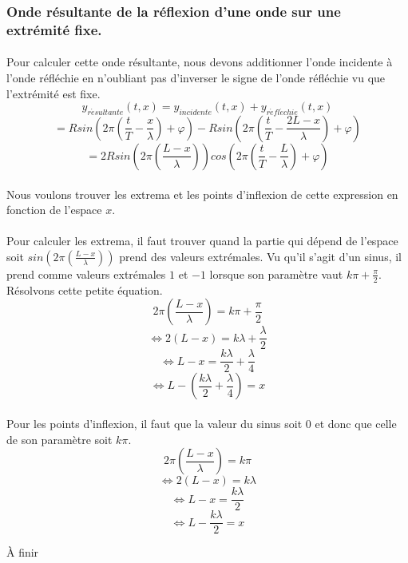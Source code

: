 \documentclass[a4paper]{article}
\begin{document}
\subsubsection{Onde résultante de la réflexion d'une onde sur une extrémité fixe.}
\paragraph{}Pour calculer cette onde résultante, nous devons additionner l'onde incidente à l'onde réfléchie en n'oubliant pas d'inverser le signe de l'onde réfléchie vu que l'extrémité est fixe.
\[y_{r\acute{e}sultante}(t,x)=y_{incidente}(t,x)+y_{r\acute{e}fl\acute{e}chie}(t,x)\]
\[=Rsin\left(2\pi \left(\frac{t}{T}-\frac{x}{\lambda}\right)+\varphi\right)-Rsin\left(2\pi \left(\frac{t}{T}-\frac{2L-x}{\lambda}\right)+\varphi\right)\]
\[=2Rsin\left(2\pi \left(\frac{L-x}{\lambda}\right)\right)cos\left(2\pi \left(\frac{t}{T}-\frac{L}{\lambda}\right)+\varphi\right)\]
\paragraph{}Nous voulons trouver les extrema et les points d'inflexion de cette expression en fonction de l'espace $x$.
\paragraph{}Pour calculer les extrema, il faut trouver quand la partie qui dépend de l'espace soit $sin\left(2\pi \left(\frac{L-x}{\lambda}\right)\right)$ prend des valeurs extrémales. Vu qu'il s'agit d'un sinus, il prend comme valeurs extrémales $1$ et $-1$ lorsque son paramètre vaut $k\pi+\frac{\pi}{2}$. Résolvons cette petite équation.
\[2\pi\left(\frac{L-x}{\lambda}\right)=k\pi+\frac{\pi}{2}\]
\[\Leftrightarrow 2\left(L-x\right)=k\lambda+\frac{\lambda}{2}\]
\[\Leftrightarrow L-x=\frac{k\lambda}{2}+\frac{\lambda}{4}\]
\[\Leftrightarrow L-\left(\frac{k\lambda}{2}+\frac{\lambda}{4}\right)=x\]
\paragraph{}Pour les points d'inflexion, il faut que la valeur du sinus soit $0$ et donc que celle de son paramètre soit $k\pi$.
\[2\pi\left(\frac{L-x}{\lambda}\right)=k\pi\]
\[\Leftrightarrow 2\left(L-x\right)=k\lambda\]
\[\Leftrightarrow L-x=\frac{k\lambda}{2}\]
\[\Leftrightarrow L-\frac{k\lambda}{2}=x\]
\begin{center}\Huge{À finir}\end{center}
\end{document}
